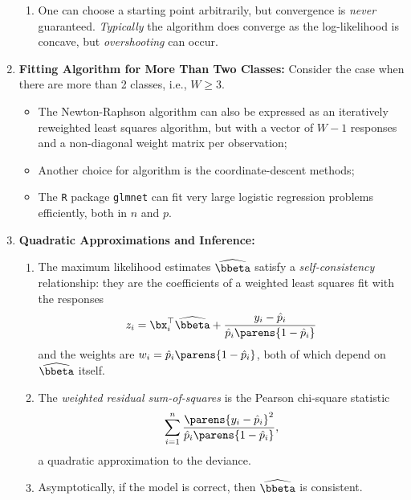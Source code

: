 \documentclass[12pt]{article}
\begin{document}
\begin{enumerate}[label=\textbf{\arabic*.}]
\begin{enumerate}
		\item One can choose a starting point arbitrarily, but convergence is \emph{never} guaranteed. \emph{Typically} the algorithm does converge as the log-likelihood is concave, but \textit{overshooting} can occur. 
	\end{enumerate}
	
	\item \textbf{Fitting Algorithm for More Than Two Classes:} Consider the case when there are more than 2 classes, i.e., $W \ge 3$. 
	\begin{itemize}
		\item The Newton-Raphson algorithm can also be expressed as an iteratively reweighted least squares algorithm, but with a vector of $W - 1 $ responses and a non-diagonal weight matrix per observation; 
		\item Another choice for algorithm is the coordinate-descent methods; 
		\item The \texttt{R} package \texttt{glmnet} can fit very large logistic regression problems efficiently, both in $n$ and $p$. 
	\end{itemize}
	
	\item \textbf{Quadratic Approximations and Inference:} 
	\begin{enumerate}
		\item The maximum likelihood estimates $\widehat{\bbeta}$ satisfy a \textit{self-consistency} relationship: they are the coefficients of a weighted least squares fit with the responses 
		\begin{align*}
			z_i = \bx_i^\top \widehat{\bbeta} + \frac{y_i - \hat{p}_i}{\hat{p}_i \parens{1 - \hat{p}_i} }
		\end{align*}
		and the weights are $w_i = \hat{p}_i \parens{1 - \hat{p}_i}$, both of which depend on $\widehat{\bbeta}$ itself. 
		
		\item The \textit{weighted residual sum-of-squares} is the Pearson chi-square statistic
		\begin{align*}
			\sum_{i=1}^n \frac{ \parens{ y_i - \hat{p}_i}^2 }{ \hat{p}_i \parens{ 1 - \hat{p}_i} }, 
		\end{align*}
		a quadratic approximation to the deviance. 
		
		\item Asymptotically, if the model is correct, then $\widehat{\bbeta}$ is consistent. 
		

\end{enumerate}
\end{enumerate}
\end{document}
